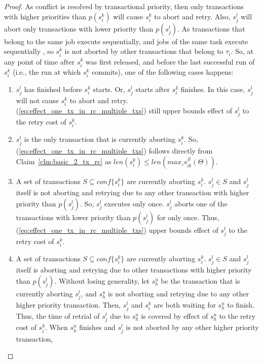 \begin{proof}
%
As conflict is resolved by transactional priority, then only transactions with higher priorities than $p(s_{i}^{k})$ will cause $s_{i}^{k}$ to abort and retry. Also, $s_j^l$ will abort only transactions with lower priority than $p(s_j^l)$. As transactions that belong to the same job execute sequentially, and jobs of the same task execute sequentially ,  so $s_i^k$ is not aborted by other transactions that belong to $\tau_i$. So, at any point of time after $s_{i}^{k}$ was first released, and before the last successful run of $s_i^k$ (i.e., the run at which $s_i^k$ commits), one of the following cases happens: 
\begin{enumerate}
\item $s_{j}^{l}$ has finished before $s_{i}^{k}$ starts. Or, $s_{j}^{l}$
starts after $s_{i}^{k}$ finishes. In this case, $s_{j}^{l}$ will
not cause $s_{i}^{k}$ to abort and retry. (\ref{eq:effect_one_tx_in_rc_multiple_txs})
still upper bounds effect of $s_{j}^{l}$ to the retry cost of $s_{i}^{k}$.
\item $s_{j}^{l}$ is the only transaction that is currently aborting $s_{i}^{k}$.
So, (\ref{eq:effect_one_tx_in_rc_multiple_txs}) follows directly
from Claim~\ref{clm:basic_2_tx_rc} as $len\left(s_{i}^{k}\right)\le len\left(max\_s_{ik}^{jl}(\Theta)\right)$. 
\item A set of transactions $S\subseteq conf\{s_{i}^{k}\}$ are currently
aborting $s_{i}^{k}$. $s_{j}^{l}\in S$ and $s_{j}^{l}$ itself is
not aborting and retrying due to any other transaction with higher
priority than $p(s_{j}^{l})$. So, $s_{j}^{l}$ executes only once.
$s_{j}^{l}$ aborts one of the transactions with lower priority than
$p(s_{j}^{l})$ for only once. Thus, (\ref{eq:effect_one_tx_in_rc_multiple_txs})
upper bounds effect of $s_{j}^{l}$ to the retry cost of $s_{i}^{k}$.
\item A set of transactions $S\subseteq conf\{s_{i}^{k}\}$ are currently
aborting $s_{i}^{k}$. $s_{j}^{l}\in S$ and $s_{j}^{l}$ itself is
aborting and retrying due to other transactions with higher priority
than $p(s_{j}^{l})$. Without losing generality, let $s_{h}^{u}$ be the transaction that is currently aborting $s_{j}^{l}$, and $s_{h}^{u}$
is not aborting and retrying due to any other higher priority transaction.
Then, $s_{j}^{l}$ and $s_{i}^{k}$ are both waiting for $s_{h}^{u}$
to finish. Thus, the time of retrial of $s_{j}^{l}$ due to $s_h^u$ is covered by effect of $s_{h}^{u}$ to the retry cost of $s_{i}^{k}$. When $s_{h}^{u}$ finishes and
$s_{j}^{l}$ is not aborted by any other higher priority transaction,

\end{enumerate}
\end{proof}

